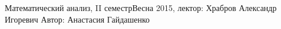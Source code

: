 


\BigHeader
	{Математический анализ, II семестр}{Весна 2015, лектор: Храбров Александр Игоревич}
	{Автор: Анастасия Гайдашенко}



